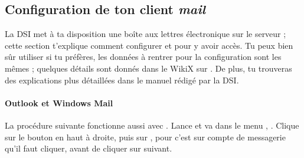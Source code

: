 




\subsection{Configuration de ton client \emph{mail}}

La DSI met \`a  ta disposition une bo\^{i}te aux lettres \'electronique sur
le serveur  ; cette section t'explique comment
configurer  et  pour y avoir acc\`es. Tu peux bien
s\^{u}r utiliser  si tu pr\'ef\`eres, les donn\'ees \`a  rentrer
pour la configuration sont les m\^emes ; quelques d\'etails sont donn\'es
dans le WikiX sur \fkz. De plus, tu trouveras des explications plus
d\'etaill\'ees dans le manuel r\'edig\'e par la DSI.

\paragraph{Outlook et Windows Mail}

La proc\'edure suivante fonctionne aussi avec .
Lance  et va dans le menu ,
. Clique sur le bouton  en
haut \`a  droite, puis sur , pour  c'est sur compte de messagerie qu'il faut cliquer, avant de cliquer sur suivant.

